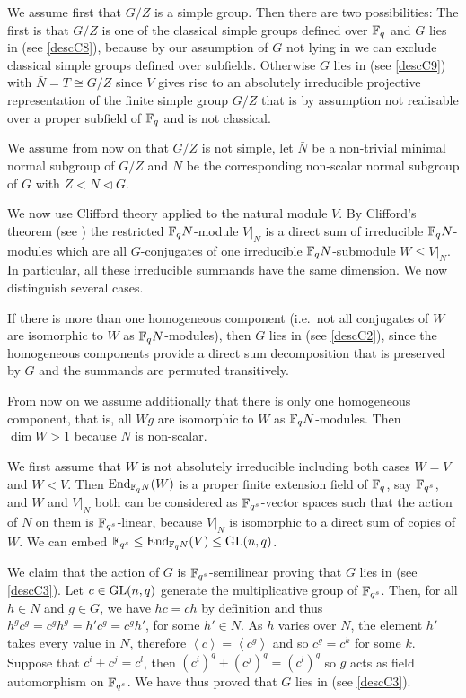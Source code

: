 We assume first that $G/Z$ is a simple group. Then there are two possibilities:
The first is that $G/Z$ is one of the
classical simple groups defined over $\mathbb{F}_q$ and $G$ lies in  (see
\ref{descC8}), because by our assumption of $G$ not lying in  we can
exclude classical simple groups defined over subfields. Otherwise
$G$ lies in  (see \ref{descC9}) with
$\bar N =T \cong G/Z$ since $V$ gives rise to an absolutely irreducible
projective representation of the finite simple group $G/Z$ that
is by assumption not realisable over a proper subfield of $\mathbb{F}_q$ and
is not classical.

We assume from now on that $G/Z$ is not simple, let $\bar N$
be a non-trivial minimal normal subgroup of $G/Z$ and $N$ be
the corresponding non-scalar normal subgroup of $G$ with $Z < N
\triangleleft G$.

We now use Clifford theory applied to the natural module $V$. By Clifford's
theorem (see \cite[(49.2) and (49.7)]{CR0}) the restricted $\mathbb{F}_q N$-module
$V|_N$ is a direct sum of irreducible $\mathbb{F}_q N$-modules which are all
$G$-conjugates of one irreducible $\mathbb{F}_q N$-submodule $W \le V|_N$. In
particular, all these irreducible summands have the same dimension. We now
distinguish several cases.

If there is more than one homogeneous component (i.e.~not all conjugates of
$W$ are isomorphic to $W$ as $\mathbb{F}_q N$-modules), then $G$ lies in 
(see \ref{descC2}),
since the homogeneous components provide a direct sum decomposition that is
preserved by $G$ and the summands are permuted transitively.

From now on we assume additionally that there is only one homogeneous
component, that is, all $Wg$ are isomorphic to $W$ as $\mathbb{F}_q N$-modules.
Then $\dim W > 1$ because $N$ is non-scalar.

We first assume that $W$ is not absolutely irreducible including both
cases $W = V$ and $W < V$. Then $\End_{\F_q N}(W)$ is a proper finite
extension field of $\mathbb{F}_q$, say $\mathbb{F}_{q^s}$, and $W$ and $V|_N$
both can be considered as $\mathbb{F}_{q^s}$-vector spaces such that the action of
$N$ on them is $\mathbb{F}_{q^s}$-linear, because $V|_N$ is isomorphic to a direct
sum of copies of $W$. We can embed $\F_{q^s} \le \End_{\F_q N}(V) \le \GL(n,q)$.

We claim that the action of $G$ is $\mathbb{F}_{q^s}$-semilinear proving that $G$ lies
in  (see \ref{descC3}). Let $c \in \GL(n,q)$ generate the
multiplicative group of $\mathbb{F}_{q^s}$. Then, for all $h \in N$ and $g
\in G$, we have $hc=ch$ by definition and thus $h^g c^g = c^g h^g =
h' c^g = c^g h'$, for some $h' \in N$. As $h$ varies over $N$, the
element $h'$ takes every value in $N$, therefore $\left< c \right>
= \left< c^g \right>$ and so $c^g = c^k$ for some $k$. Suppose that
$c^i + c^j = c^l$, then $(c^i)^g + (c^j)^g = (c^l)^g$ so $g$ acts as
field automorphism on $\mathbb{F}_{q^s}$. We have thus proved that $G$ 
lies in  (see \ref{descC3}).

